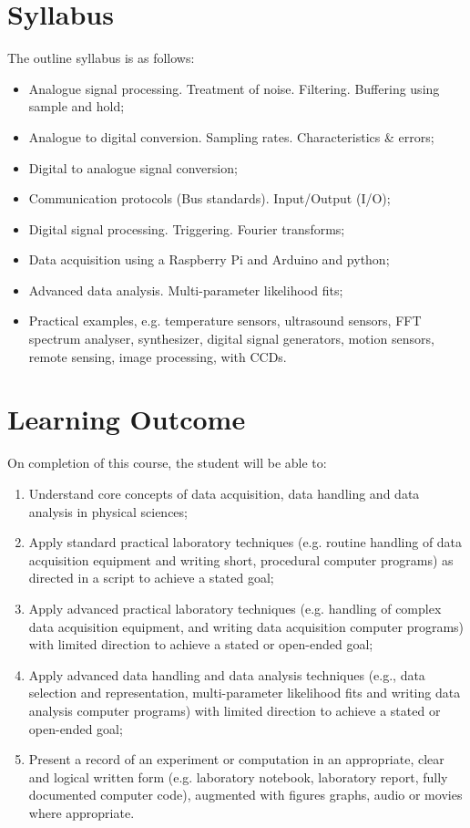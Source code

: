\section{Syllabus}

The outline syllabus is as follows:\\
\begin{itemize}
\item Analogue signal processing. Treatment of noise. Filtering. Buffering using sample and hold;
\item Analogue to digital conversion. Sampling rates. Characteristics \& errors; 
\item Digital to analogue signal conversion;
\item Communication protocols (Bus standards). Input/Output (I/O);
\item Digital signal processing. Triggering. Fourier transforms;
\item Data acquisition using a Raspberry Pi and Arduino and python;
\item Advanced data analysis. Multi-parameter likelihood fits;
\item Practical examples, e.g. temperature sensors, ultrasound sensors, FFT spectrum analyser,
synthesizer, digital signal generators, motion sensors, remote sensing, image processing, with CCDs.
\end{itemize}

\section{Learning Outcome}
 On completion of this course, the student will be able to:

\begin{enumerate}
\item    Understand core concepts of data acquisition, data handling and data analysis in physical sciences;
\item    Apply standard practical laboratory techniques (e.g. routine handling of data acquisition equipment and writing short, procedural computer programs) as directed in a script to achieve a stated goal;
\item    Apply advanced practical laboratory techniques (e.g. handling of complex data acquisition equipment, and writing data acquisition computer programs) with limited direction to achieve a stated or open-ended goal;
\item    Apply advanced data handling and data analysis techniques (e.g., data selection and representation, multi-parameter likelihood fits and writing data analysis computer programs) with limited direction to achieve a stated or open-ended goal;
\item    Present a record of an experiment or computation in an appropriate, clear and logical written form (e.g. laboratory notebook, laboratory report, fully documented computer code), augmented with figures graphs, audio or movies where appropriate.
\end{enumerate}


